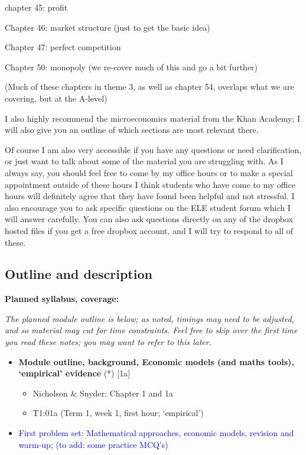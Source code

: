 \documentclass[]{article}
\providecommand{\tightlist}{%
  \setlength{\itemsep}{0pt}\setlength{\parskip}{0pt}}
\begin{document}
chapter 45: profit

Chapter 46: market structure (just to get the basic idea)

Chapter 47: perfect competition

Chapter 50: monopoly (we re-cover much of this and go a bit further)

(Much of these chapters in theme 3, as well as chapter 54, overlaps what
we are covering, but at the A-level)

I also highly recommend the microeconomics material from the Khan
Academy; I will also give you an outline of which sections are most
relevant there.

Of course I am also very accessible if you have any questions or need
clarification, or just want to talk about some of the material you are
struggling with. As I always say, you should feel free to come by my
office hours or to make a special appointment outside of these hours I
think students who have come to my office hours will definitely agree
that they have found been helpful and not stressful. I also encourage
you to ask specific questions on the ELE student forum which I will
answer carefully. You can also ask questions directly on any of the
dropbox hosted files if you get a free dropbox account, and I will try
to respond to all of these.

\hypertarget{outline-and-description}{%
\subsection{Outline and description}\label{outline-and-description}}

\textbf{Planned syllabus, coverage:}

\emph{The planned module outline is below; as noted, timings may need to
be adjusted, and so material may cut for time constraints. Feel free to
skip over the first time you read these notes; you may want to refer to
this later.}

\begin{itemize}
\tightlist
\item
  \textbf{Module outline, background, Economic models (and maths tools),
  `empirical' evidence} (*) {[}1a{]}

  \begin{itemize}
  \tightlist
  \item
    Nicholson \& Snyder: Chapter 1 and 1a
  \item
    T1:01a (Term 1, week 1, first hour; `empirical')
  \end{itemize}
\item
  \textcolor{blue}{First problem set: Mathematical approaches, economic models, revision and warm-up; (to add: some practice MCQ's)}
\end{itemize}
\end{document}
